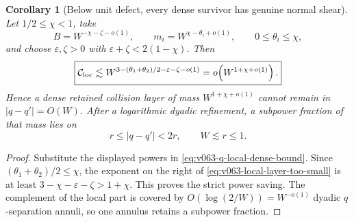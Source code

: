\documentclass[10pt]{article}
\newtheorem{corollary}[theorem]{Corollary}
\begin{document}
\begin{corollary}[Below unit defect, every dense survivor has genuine normal shear]
\label{cor:v063-dense-survivor-normal-shear}
Let \(1/2\le\chi<1\), take
\[
B=W^{-\chi-\zeta-o(1)},
\qquad
m_i=W^{\chi-\theta_i+o(1)},
\qquad
0\le\theta_i\le\chi,
\]
and choose \(\varepsilon,\zeta>0\) with
\(\varepsilon+\zeta<2(1-\chi)\).  Then
\begin{equation}
\label{eq:v063-local-layer-too-small}
\boxed{
\mathcal C_{\rm loc}
\lesssim
W^{3-(\theta_1+\theta_2)/2-\varepsilon-\zeta-o(1)}
=
o\!\left(W^{1+\chi+o(1)}\right).
}
\end{equation}
Hence a dense retained collision layer of mass \(W^{1+\chi+o(1)}\) cannot remain in
\(|q-q'|=O(W)\).  After a logarithmic dyadic refinement, a subpower fraction of that mass lies on
\begin{equation}
\label{eq:v063-normal-offset-annulus}
\boxed{
r\le|q-q'|<2r,
\qquad
W\lesssim r\le1.
}
\end{equation}
\end{corollary}

\begin{proof}
Substitute the displayed powers in
\eqref{eq:v063-q-local-dense-bound}.  Since
\((\theta_1+\theta_2)/2\le\chi\), the exponent on the right of
\eqref{eq:v063-local-layer-too-small} is at least
\(3-\chi-\varepsilon-\zeta>1+\chi\).  This proves the strict power saving.  The complement of the
local part is covered by \(O(\log(2/W))=W^{-o(1)}\) dyadic \(q\)-separation annuli, so one annulus
retains a subpower fraction.
\end{proof}
\end{document}
